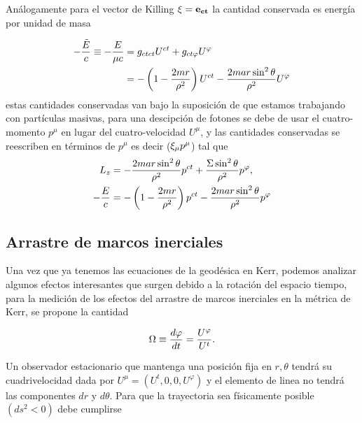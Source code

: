Análogamente para el vector de Killing $\mathbf{\xi} = \mathbf{e_{ct}}$ la cantidad conservada es energía por unidad de masa

\begin{equation}
    \begin{aligned}
        - \frac{\tilde{E}}{c} \equiv -\frac{E}{\mu c} & = g_{ ct ct}   U^{ct}  +g_{ ct \varphi}  U^\varphi                                              \\
                                                      & =   -\left(1-\frac{2 mr}{\rho^2}\right)  U^{ct} -    \frac{2 mar \sin^2\theta}{\rho^2}    U^\varphi
    \end{aligned}
\end{equation}
estas cantidades conservadas van bajo la suposición de que estamos trabajando con partículas masivas, para una descipción de fotones se debe de usar el cuatro-momento $p^\mu$ en lugar del cuatro-velocidad $U^\mu$, y las cantidades conservadas  se reescriben en términos de $p^\mu$ es decir ($\mathbf{\xi}_\mu p^\mu$) tal que
\begin{align}
    L_z         & =- \frac{2 mar \sin^2\theta}{\rho^2}   p^{ct} + \frac{\Sigma \sin^2\theta}{\rho^2}  p^\varphi,     \\
    - \frac{E}{c} & =  - \left(1-\frac{2 mr}{\rho^2}\right)  p^{ct} -   \frac{2 mar \sin^2\theta}{\rho^2}    p^\varphi
\end{align}



\subsection{Arrastre de marcos inerciales}
Una vez que ya tenemos las ecuaciones de la geodésica en Kerr, podemos analizar algunos efectos interesantes que surgen debido a la rotación del espacio tiempo, para la medición de los efectos del arrastre de marcos inerciales en la métrica de Kerr, se propone la cantidad

\begin{equation}
    \Omega \equiv \frac{d \varphi}{d t}=\frac{U^{\varphi}}{U^t}.
\end{equation}

Un observador estacionario que mantenga una posición fija en $r,\theta$ tendrá su cuadrivelocidad dada por  $U^\mu=\left(U^t, 0,0, U^{\varphi}\right)$ y el elemento de linea no tendrá las componentes $dr$ y $d\theta$.
Para que la trayectoria sea físicamente posible $\left(d s^2<0\right)$ debe cumplirse

